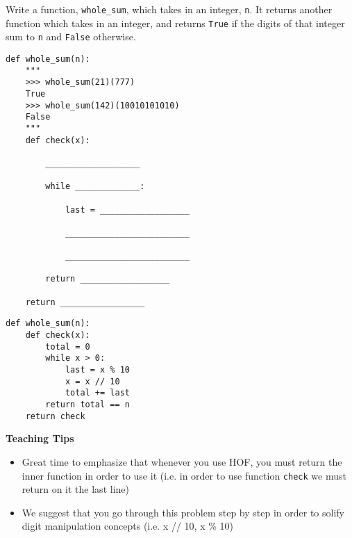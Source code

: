 \begin{blocksection}
\question Write a function, \texttt{whole\_sum}, which takes in an integer, \texttt{n}. It returns another function which takes in an integer, and returns \texttt{True} if the digits of that integer sum to \texttt{n} and \texttt{False} otherwise.

\begin{lstlisting}
def whole_sum(n): 
    """ 
    >>> whole_sum(21)(777)
    True
    >>> whole_sum(142)(10010101010)
    False
    """
    def check(x):

        ___________________
		
        while _____________:
		
            last = __________________
				
            _________________________
				
            _________________________
				
        return __________________
		
    return _________________

\end{lstlisting}

\begin{solution}
\begin{lstlisting}
def whole_sum(n):
    def check(x):
        total = 0
        while x > 0:
            last = x % 10
            x = x // 10
            total += last
        return total == n
    return check
\end{lstlisting}
\end{solution}
\end{blocksection}

\begin{questionmeta}
    \textbf{Teaching Tips}
      \begin{itemize}
        \item Great time to emphasize that whenever you use HOF,
         you must return the inner function in order to use it 
         (i.e. in order to use function \lstinline{check} we must return on it the last line)
        \item We suggest that you go through this problem step by step
         in order to solify digit manipulation concepts (i.e. x // 10, x \% 10)
      \end{itemize}
\end{questionmeta}
